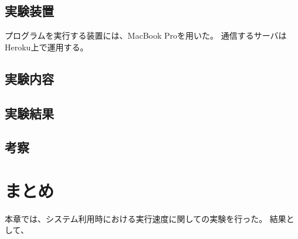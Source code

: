 \subsection{実験装置}\label{ux5b9fux9a13ux88c5ux7f6e-1}

プログラムを実行する装置には、MacBook Proを用いた。
通信するサーバはHeroku上で運用する。

\subsection{実験内容}\label{ux5b9fux9a13ux5185ux5bb9}

\subsection{実験結果}\label{ux5b9fux9a13ux7d50ux679c-1}

\subsection{考察}\label{ux8003ux5bdf}

\section{まとめ}\label{ux307eux3068ux3081}

本章では、システム利用時における実行速度に関しての実験を行った。
結果として、
